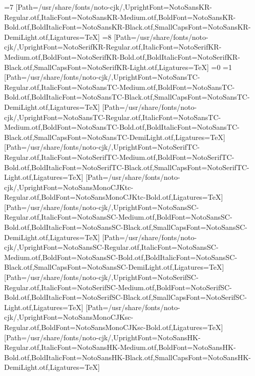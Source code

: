 \else\ifnum\value{CJKFonts}=7
[Path=/usr/share/fonts/noto-cjk/,UprightFont=NotoSansKR-Regular.otf,ItalicFont=NotoSansKR-Medium.otf,BoldFont=NotoSansKR-Bold.otf,BoldItalicFont=NotoSansKR-Black.otf,SmallCapsFont=NotoSansKR-DemiLight.otf,Ligatures=TeX]
\else\ifnum\value{CJKFonts}=8
[Path=/usr/share/fonts/noto-cjk/,UprightFont=NotoSerifKR-Regular.otf,ItalicFont=NotoSerifKR-Medium.otf,BoldFont=NotoSerifKR-Bold.otf,BoldItalicFont=NotoSerifKR-Black.otf,SmallCapsFont=NotoSerifKR-Light.otf,Ligatures=TeX]
\fi\fi\fi\fi\fi\fi\fi\fi\fi\fi\fi\fi\fi\fi
\ifnum\value{NotoCJKFamily}=0
\else\ifnum\value{NotoCJKFamily}=1
\newfontfamily{}[Path=/usr/share/fonts/noto-cjk/,UprightFont=NotoSansTC-Regular.otf,ItalicFont=NotoSansTC-Medium.otf,BoldFont=NotoSansTC-Bold.otf,BoldItalicFont=NotoSansTC-Black.otf,SmallCapsFont=NotoSansTC-DemiLight.otf,Ligatures=TeX]
\newfontfamily{}[Path=/usr/share/fonts/noto-cjk/,UprightFont=NotoSansTC-Regular.otf,ItalicFont=NotoSansTC-Medium.otf,BoldFont=NotoSansTC-Bold.otf,BoldItalicFont=NotoSansTC-Black.otf,SmallCapsFont=NotoSansTC-DemiLight.otf,Ligatures=TeX]
\newfontfamily{}[Path=/usr/share/fonts/noto-cjk/,UprightFont=NotoSerifTC-Regular.otf,ItalicFont=NotoSerifTC-Medium.otf,BoldFont=NotoSerifTC-Bold.otf,BoldItalicFont=NotoSerifTC-Black.otf,SmallCapsFont=NotoSerifTC-Light.otf,Ligatures=TeX]
\newfontfamily{}[Path=/usr/share/fonts/noto-cjk/,UprightFont=NotoSansMonoCJKtc-Regular.otf,BoldFont=NotoSansMonoCJKtc-Bold.otf,Ligatures=TeX]
\newfontfamily{}[Path=/usr/share/fonts/noto-cjk/,UprightFont=NotoSansSC-Regular.otf,ItalicFont=NotoSansSC-Medium.otf,BoldFont=NotoSansSC-Bold.otf,BoldItalicFont=NotoSansSC-Black.otf,SmallCapsFont=NotoSansSC-DemiLight.otf,Ligatures=TeX]
\newfontfamily{}[Path=/usr/share/fonts/noto-cjk/,UprightFont=NotoSansSC-Regular.otf,ItalicFont=NotoSansSC-Medium.otf,BoldFont=NotoSansSC-Bold.otf,BoldItalicFont=NotoSansSC-Black.otf,SmallCapsFont=NotoSansSC-DemiLight.otf,Ligatures=TeX]
\newfontfamily{}[Path=/usr/share/fonts/noto-cjk/,UprightFont=NotoSerifSC-Regular.otf,ItalicFont=NotoSerifSC-Medium.otf,BoldFont=NotoSerifSC-Bold.otf,BoldItalicFont=NotoSerifSC-Black.otf,SmallCapsFont=NotoSerifSC-Light.otf,Ligatures=TeX]
\newfontfamily{}[Path=/usr/share/fonts/noto-cjk/,UprightFont=NotoSansMonoCJKsc-Regular.otf,BoldFont=NotoSansMonoCJKsc-Bold.otf,Ligatures=TeX]
\newfontfamily{}[Path=/usr/share/fonts/noto-cjk/,UprightFont=NotoSansHK-Regular.otf,ItalicFont=NotoSansHK-Medium.otf,BoldFont=NotoSansHK-Bold.otf,BoldItalicFont=NotoSansHK-Black.otf,SmallCapsFont=NotoSansHK-DemiLight.otf,Ligatures=TeX]
